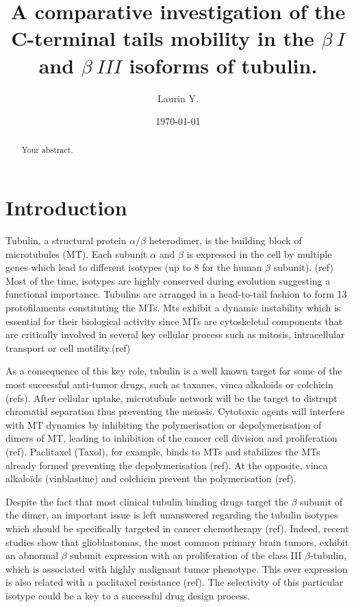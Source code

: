 \documentclass[a4paper]{article}
\title{A comparative investigation of the C-terminal tails mobility in the $\beta~I$
and $\beta~III$ isoforms of tubulin.}
\author{Laurin Y.}
\date{\today}
\begin{document}
\maketitle

\begin{abstract}
Your abstract.
\end{abstract}

\section{Introduction}

Tubulin, a structural protein $\alpha/\beta$ heterodimer, is the building block of
microtubules (MT). Each subunit $\alpha$ and $\beta$ is expressed in the cell by multiple
genes which lead to different isotypes (up to 8 for the human $\beta$ subunit). (ref)
Most of the time, isotypes are highly conserved during evolution suggesting a functional
importance. Tubulins are arranged in a head-to-tail fashion to form 13 protofilaments
constituting the MTs. Mts exhibit a dynamic instability which is essential for their
biological activity since MTs are cytoskeletal components that are critically involved
in several key cellular process such as mitosis, intracellular transport or cell motility.(ref)

As a consequence of this key role, tubulin is a well known target for some of the
most successful anti-tumor drugs, such as taxanes, vinca alkaloïds or colchicin (refs).
After cellular uptake, microtubule network will be the target to distrupt chromatid
separation thus preventing the meiosis. Cytotoxic agents will interfere with MT
dynamics by inhibiting the polymerisation or depolymerisation of dimers of MT, leading
to inhibition of the cancer cell division and proliferation (ref). Paclitaxel (Taxol), for
example, binds to MTs and stabilizes the MTs already formed preventing the depolymerisation (ref).
At the opposite, vinca alkaloïds (vinblastine) and colchicin prevent the polymerisation (ref).

Despite the fact that most clinical tubulin binding drugs target the $\beta$ subunit
of the dimer, an important issue is left unanswered regarding the tubulin
isotypes which should be specifically targeted in cancer chemotherapy (ref). Indeed,
recent studies show that glioblastomas, the most common primary brain tumors, exhibit
an abnormal $\beta$ subunit expression with an proliferation of the class III $\beta$-tubulin,
which is associated with highly malignant tumor phenotype. This over expression is also
related with a paclitaxel resistance (ref). The selectivity of this particular isotype could be
a key to a successful drug design process.
\end{document}
